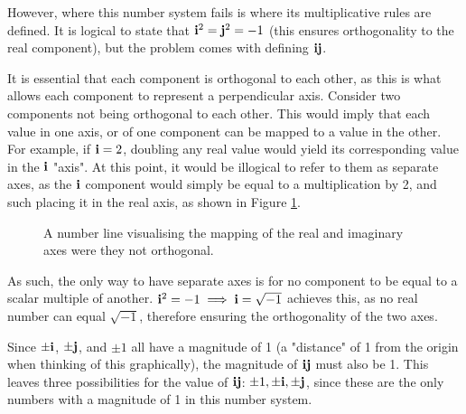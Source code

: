 \documentclass[10pt]{article}
\begin{document}
However, where this number system fails is where its multiplicative rules are defined. It is logical to state that $\vb{i}^2 = \vb{j}^2 = -1$ (this ensures orthogonality to the real component), but the problem comes with defining $\vb{ij}$.

It is essential that each component is orthogonal to each other, as this is what allows each component to represent a perpendicular axis. Consider two components not being orthogonal to each other. This would imply that each value in one axis, or of one component can be mapped to a value in the other. For example, if $\vb{i} = 2$, doubling any real value would yield its corresponding value in the $\vb{i}$ "axis". At this point, it would be illogical to refer to them as separate axes, as the $\vb{i}$ component would simply be equal to a multiplication by 2, and such placing it in the real axis, as shown in Figure \ref{RealLineFig}.

\begin{figure}[H]
    \centering
    \caption{A number line visualising the mapping of the real and imaginary axes were they not orthogonal.}
    \label{RealLineFig}
\end{figure}

As such, the only way to have separate axes is for no component to be equal to a scalar multiple of another. $\vb{i}^2 = -1 \implies \vb{i} = \sqrt{-1}$ achieves this, as no real number can equal $\sqrt{-1}$, therefore ensuring the orthogonality of the two axes.

Since $\pm\vb{i}$, $\pm\vb{j}$, and $\pm1$ all have a magnitude of 1 (a "distance" of 1 from the origin when thinking of this graphically), the magnitude of $\vb{ij}$ must also be 1. This leaves three possibilities for the value of $\vb{ij}$: $\pm1, \pm\vb{i}, \pm\vb{j}$, since these are the only numbers with a magnitude of 1 in this number system.
\end{document}
